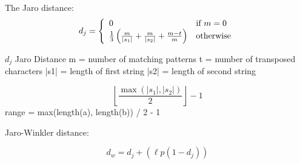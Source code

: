 
The Jaro distance:
\begin{equation}
  d_j = \left\{
  \begin{array}{l l}
    0 & \text{if }m = 0 \\ 
    \frac{1}{3}\left(\frac{m}{|s_1|} + \frac{m}{|s_2|} + \frac{m-t}{m}\right) & \text{otherwise} \end{array} \right.
\end{equation}

$ d_j $ Jaro Distance
m = number of matching patterns
t = number of transposed characters
|s1| = length of first string
|s2| = length of second string

\begin{equation}
  \left\lfloor\frac{\max(|s_1|,|s_2|)}{2}\right\rfloor-1
\end{equation}
range = max(length(a), length(b)) / 2 - 1


Jaro-Winkler distance:

\begin{equation}
  d_w = d_j + (\ell p (1 - d_j))
\end{equation}

